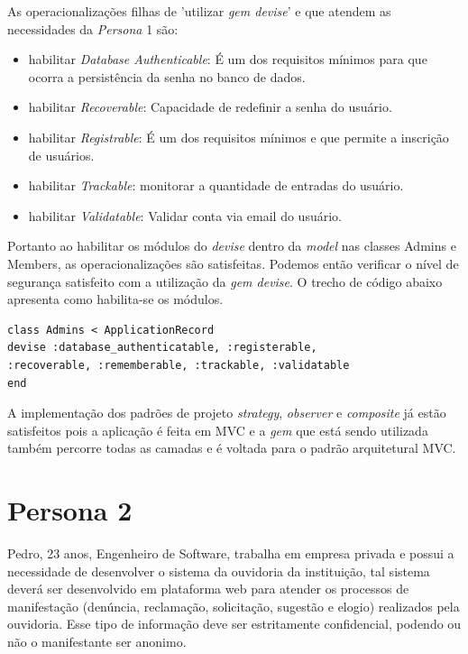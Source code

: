 As operacionalizações filhas de 'utilizar \textit{gem devise}' e que atendem as necessidades da \textit{Persona} 1 são:

\begin{itemize}
	\item habilitar \textit{Database Authenticable}: É um dos requisitos mínimos para que ocorra a persistência da senha no banco de dados.
	\item habilitar \textit{Recoverable}: Capacidade de redefinir a senha do usuário.
	\item habilitar \textit{Registrable}: É um dos requisitos mínimos e que permite a inscrição de usuários. 
	\item habilitar \textit{Trackable}: monitorar a quantidade de entradas do usuário. 
	\item habilitar \textit{Validatable}: Validar conta via email do usuário. 
\end{itemize}

Portanto ao habilitar os módulos do \textit{devise} dentro da \textit{model} nas classes Admins e Members, as operacionalizações são satisfeitas. Podemos então verificar o nível de segurança satisfeito com a utilização da \textit{gem devise}. O trecho de código abaixo apresenta como habilita-se os módulos.  
 

\begin{lstlisting} 
class Admins < ApplicationRecord
devise :database_authenticatable, :registerable,
:recoverable, :rememberable, :trackable, :validatable
end
\end{lstlisting} 

A implementação dos padrões de projeto \textit{strategy}, \textit{observer} e \textit{composite} já estão satisfeitos pois a aplicação é feita em MVC e a \textit{gem} que está sendo utilizada também percorre todas as camadas e é voltada para o padrão arquitetural MVC. 

\section{Persona 2}
\label{subsec:persona2}

Pedro, 23 anos, Engenheiro de Software, trabalha em empresa privada e possui a necessidade de desenvolver o sistema da ouvidoria da instituição, tal sistema deverá ser desenvolvido em plataforma web para atender os processos de manifestação (denúncia, reclamação, solicitação, sugestão e elogio) realizados pela ouvidoria. Esse tipo de informação deve ser estritamente confidencial, podendo ou não o manifestante ser anonimo.  

